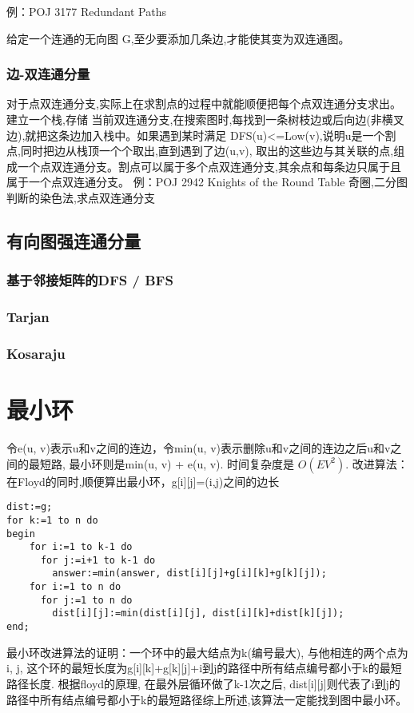 例：POJ 3177 Redundant Paths 

给定一个连通的无向图 G,至少要添加几条边,才能使其变为双连通图。


\subsubsection{边-双连通分量}
对于点双连通分支,实际上在求割点的过程中就能顺便把每个点双连通分支求出。建立一个栈,存储 当前双连通分支,在搜索图时,每找到一条树枝边或后向边(非横叉边),就把这条边加入栈中。如果遇到某时满足 DFS(u)<=Low(v),说明u是一个割点,同时把边从栈顶一个个取出,直到遇到了边(u,v), 取出的这些边与其关联的点,组成一个点双连通分支。割点可以属于多个点双连通分支,其余点和每条边只属于且属于一个点双连通分支。 
例：POJ 2942 Knights of the Round Table
奇圈,二分图判断的染色法,求点双连通分支


\subsection{有向图强连通分量}
\subsubsection{基于邻接矩阵的DFS / BFS}


\subsubsection{Tarjan}


\subsubsection{Kosaraju}


\section{最小环}
令e(u, v)表示u和v之间的连边，令min(u, v)表示删除u和v之间的连边之后u和v之间的最短路, 最小环则是min(u, v) + e(u, v). 时间复杂度是 $O(EV^2)$. 
改进算法：在Floyd的同时,顺便算出最小环，g[i][j]=(i,j)之间的边长
\begin{lstlisting}
dist:=g;
for k:=1 to n do
begin
    for i:=1 to k-1 do
      for j:=i+1 to k-1 do
        answer:=min(answer, dist[i][j]+g[i][k]+g[k][j]);
    for i:=1 to n do
      for j:=1 to n do
        dist[i][j]:=min(dist[i][j], dist[i][k]+dist[k][j]);
end;
\end{lstlisting}
最小环改进算法的证明：一个环中的最大结点为k(编号最大), 与他相连的两个点为i, j, 这个环的最短长度为g[i][k]+g[k][j]+i到j的路径中所有结点编号都小于k的最短路径长度. 根据floyd的原理, 在最外层循环做了k-1次之后, dist[i][j]则代表了i到j的路径中所有结点编号都小于k的最短路径综上所述,该算法一定能找到图中最小环。


